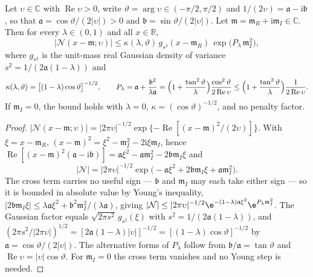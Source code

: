 \begin{lemma}
\label{lem:exactmfull-b0-domination}
Let \(\upsilon\in\mathbb C\) with \(\operatorname{Re}\upsilon>0\), write
\(\vartheta=\arg\upsilon\in(-\pi/2,\pi/2)\) and
\(1/(2\upsilon)=\mathfrak a-\mathrm i\mathfrak b\), so that
\(\mathfrak a=\cos\vartheta/(2|\upsilon|)>0\) and
\(\mathfrak b=\sin\vartheta/(2|\upsilon|)\).  Let
\(\mathfrak m=\mathfrak m_R+\mathrm i\mathfrak m_I\in\mathbb C\).  Then for
every \(\lambda\in(0,1)\) and all \(x\in\mathbb R\),
\begin{equation}
 \bigl|\mathcal N(x-\mathfrak m;\upsilon)\bigr|
 \le\kappa(\lambda,\vartheta)\,
 g_{s^2}(x-\mathfrak m_R)\,
 \exp\!\bigl(P_\lambda\,\mathfrak m_I^2\bigr),
 \label{eq:exactmfull-b0-domination}
\end{equation}
where \(g_{s^2}\) is the unit-mass real Gaussian density of variance
\(s^2=1/(2\mathfrak a(1-\lambda))\) and
\begin{equation}
 \kappa(\lambda,\vartheta)
 =\bigl[(1-\lambda)\cos\vartheta\bigr]^{-1/2},
 \qquad
 P_\lambda
 =\mathfrak a+\frac{\mathfrak b^2}{\lambda\mathfrak a}
 =\Bigl(1+\frac{\tan^2\vartheta}{\lambda}\Bigr)
  \frac{\cos^2\vartheta}{2\operatorname{Re}\upsilon}
 \le\Bigl(1+\frac{\tan^2\vartheta}{\lambda}\Bigr)
  \frac{1}{2\operatorname{Re}\upsilon}.
 \label{eq:exactmfull-b0-kappaP}
\end{equation}
If \(\mathfrak m_I=0\), the bound holds with \(\lambda=0\),
\(\kappa=(\cos\vartheta)^{-1/2}\), and no penalty factor.
\end{lemma}

\begin{proof}
\(|\mathcal N(x-\mathfrak m;\upsilon)|
=|2\pi\upsilon|^{-1/2}\exp\{-\operatorname{Re}[(x-\mathfrak m)^2/(2\upsilon)]\}\).
With \(\xi=x-\mathfrak m_R\),
\((x-\mathfrak m)^2=\xi^2-\mathfrak m_I^2-2\mathrm i\xi\mathfrak m_I\),
hence
\(\operatorname{Re}[(x-\mathfrak m)^2(\mathfrak a-\mathrm i\mathfrak b)]
=\mathfrak a\xi^2-\mathfrak a\mathfrak m_I^2
-2\mathfrak b\mathfrak m_I\xi\) and
\begin{equation*}
 |\mathcal N|
 =|2\pi\upsilon|^{-1/2}
 \exp\!\bigl(-\mathfrak a\xi^2+2\mathfrak b\mathfrak m_I\xi
 +\mathfrak a\mathfrak m_I^2\bigr).
\end{equation*}
The cross term carries no useful sign --- \(\mathfrak b\) and
\(\mathfrak m_I\) may each take either sign --- so it is bounded in absolute
value by Young's inequality,
\(|2\mathfrak b\mathfrak m_I\xi|\le\lambda\mathfrak a\xi^2
+\mathfrak b^2\mathfrak m_I^2/(\lambda\mathfrak a)\), giving
\(|\mathcal N|\le|2\pi\upsilon|^{-1/2}
\e^{-(1-\lambda)\mathfrak a\xi^2}\e^{P_\lambda\mathfrak m_I^2}\).
The Gaussian factor equals \(\sqrt{2\pi s^2}\,g_{s^2}(\xi)\) with
\(s^2=1/(2\mathfrak a(1-\lambda))\), and
\((2\pi s^2/|2\pi\upsilon|)^{1/2}
=[2\mathfrak a(1-\lambda)|\upsilon|]^{-1/2}
=[(1-\lambda)\cos\vartheta]^{-1/2}\)
by \(\mathfrak a=\cos\vartheta/(2|\upsilon|)\).  The alternative forms of
\(P_\lambda\) follow from \(\mathfrak b/\mathfrak a=\tan\vartheta\) and
\(\operatorname{Re}\upsilon=|\upsilon|\cos\vartheta\).  For
\(\mathfrak m_I=0\) the cross term vanishes and no Young step is needed.
\end{proof}

